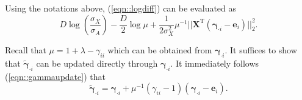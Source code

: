 \documentclass{article}
\begin{document}
\begin{appendices}
    Using the notations above, (\ref{eqn::logdiff}) can be evaluated as \begin{equation}D\log \left(\frac{\sigma_X}{\sigma_A}\right) - \frac{D}{2}\log \mu + \frac{1}{2\sigma_X^2}\mu^{-1}||{\mathbf{X}}^{\mathrm{T}}(\boldsymbol{\gamma}_{\cdot i} - \boldsymbol{e}_i)||_2^2.\end{equation}

    Recall that $\mu = 1 + \lambda - \gamma_{ii}$ which can be obtained from $\boldsymbol{\gamma}_{\cdot i}$. It suffices to show that $\widetilde{\boldsymbol{\gamma}}_{\cdot i}$ can be updated directly through $\boldsymbol{\gamma}_{\cdot i}$.
    It immediately follows (\ref{eqn::gammaupdate}) that \begin{equation}\widetilde{\boldsymbol{\gamma}}_{\cdot i} = \boldsymbol{\gamma}_{\cdot i} + \mu^{-1}(\gamma_{ii} - 1)(\boldsymbol{\gamma}_{\cdot i} - \boldsymbol{e}_i).\end{equation}
\end{appendices}
\end{document}

